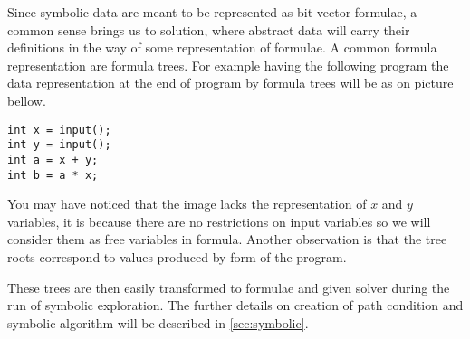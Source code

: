 Since symbolic data are meant to be represented as bit-vector formulae,
a common sense brings us to solution, where abstract data will carry their
definitions in the way of some representation of formulae. A common formula
representation are formula trees. For example having the following program the
data representation at the end of program by formula trees will be as on picture bellow.


\begin{center}
\begin{minipage}{.3\textwidth}
\begin{verbatim}
int x = input();
int y = input();
int a = x + y;
int b = a * x;
\end{verbatim}
\end{minipage}
\begin{minipage}{.55\textwidth}
\end{minipage}
\end{center}

You may have noticed that the image lacks the representation of $x$ and $y$
variables, it is because there are no restrictions on input variables so we will
consider them as free variables in formula. Another observation is that the tree
roots correspond to values produced by \SSA form of the program.

These trees are then easily transformed to formulae and given \SMT solver during
the run of symbolic exploration. The further details on creation of path
condition and symbolic algorithm will be described in \autoref{sec:symbolic}.

